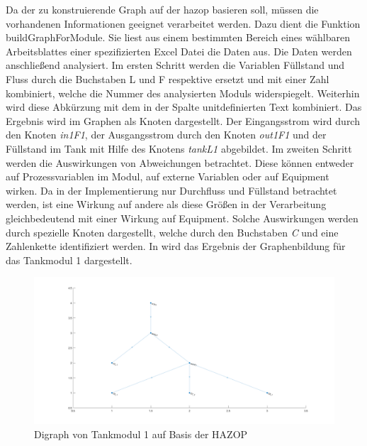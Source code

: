 Da der zu konstruierende Graph auf der \ac{hazop} basieren soll, m\"ussen die vorhandenen Informationen geeignet verarbeitet werden. Dazu dient die Funktion \glqq buildGraphForModule\grqq { }. Sie liest aus einem bestimmten Bereich eines w\"ahlbaren Arbeitsblattes einer spezifizierten Excel Datei die Daten aus. Die Daten werden anschlie\ss{}end analysiert. \newline
Im ersten Schritt werden die Variablen F\"ullstand und Fluss durch die Buchstaben L und F respektive ersetzt und mit einer Zahl kombiniert, welche die Nummer des analysierten Moduls widerspiegelt. Weiterhin wird diese Abk\"urzung mit dem in der Spalte \glqq unit\grqq { }definierten Text kombiniert. Das Ergebnis wird im Graphen als Knoten dargestellt. Der Eingangsstrom wird durch den Knoten \textit{in1F1}, der Ausgangsstrom durch den Knoten \textit{out1F1} und der F\"ullstand im Tank mit Hilfe des Knotens \textit{tankL1} abgebildet. \newline
Im zweiten Schritt werden die Auswirkungen von Abweichungen betrachtet. Diese k\"onnen entweder auf Prozessvariablen im Modul, auf externe Variablen oder auf Equipment wirken. Da in der Implementierung nur Durchfluss und F\"ullstand betrachtet werden, ist eine Wirkung auf andere als diese Gr\"o\ss{}en in der Verarbeitung gleichbedeutend mit einer Wirkung auf Equipment. Solche Auswirkungen werden durch spezielle Knoten dargestellt, welche durch den Buchstaben \textit{C} und eine Zahlenkette identifiziert werden. In  wird das Ergebnis der Graphenbildung f\"ur das Tankmodul 1 dargestellt.

\begin{figure}[h!tb]
\centering
\includegraphics[width=\textwidth]{bilder/04_code_Modul1.png}
\caption[Digraph von Modul 1]{Digraph von Tankmodul 1 auf Basis der HAZOP}
\label{fig:graph_mod1}
\end{figure}

